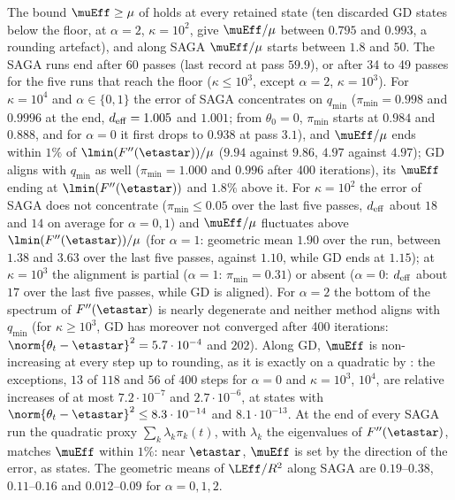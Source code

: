 The bound $\muEff\ge\mu$ of  holds at every retained state (ten discarded GD states below the floor,
at $\alpha=2$, $\kappa=10^2$, give $\muEff/\mu$ between $0.795$ and $0.993$, a rounding artefact), and along SAGA $\muEff/\mu$ starts between
$1.8$ and $50$. The SAGA runs end after 60 passes (last record at pass $59.9$), or after 34 to 49 passes for the five runs
that reach the floor ($\kappa\le10^3$, except $\alpha=2$, $\kappa=10^3$). For $\kappa=10^4$ and $\alpha\in\{0,1\}$ the
error of SAGA concentrates on $q_{\min}$ ($\pi_{\min}=0.998$ and $0.9996$ at the end, $d_{\rm eff}=1.005$ and $1.001$;
from $\theta_0=0$, $\pi_{\min}$ starts at $0.984$ and $0.888$, and for $\alpha=0$ it first drops to $0.938$ at pass
$3.1$), and $\muEff/\mu$ ends within $1\%$ of $\lmin(F''(\etastar))/\mu$ ($9.94$ against $9.86$, $4.97$ against $4.97$);
GD aligns with $q_{\min}$ as well ($\pi_{\min}=1.000$ and $0.996$ after 400 iterations), its $\muEff$ ending at
$\lmin(F''(\etastar))$ and $1.8\%$ above it. For $\kappa=10^2$ the error of SAGA does not concentrate ($\pi_{\min}\le0.05$
over the last five passes, $d_{\rm eff}$ about $18$ and $14$ on average for $\alpha=0,1$) and $\muEff/\mu$ fluctuates
above $\lmin(F''(\etastar))/\mu$ (for $\alpha=1$: geometric mean $1.90$ over the run, between $1.38$ and $3.63$ over the
last five passes, against $1.10$, while GD ends at $1.15$); at $\kappa=10^3$ the alignment is partial ($\alpha=1$:
$\pi_{\min}=0.31$) or absent ($\alpha=0$: $d_{\rm eff}$ about $17$ over the last five passes, while GD is aligned). For
$\alpha=2$ the bottom of the spectrum of $F''(\etastar)$ is nearly degenerate and neither method aligns with $q_{\min}$
(for $\kappa\ge10^3$, GD has moreover not converged after 400 iterations: $\norm{\theta_t-\etastar}^2=5.7\cdot10^{-4}$ and
$202$). Along GD, $\muEff$ is non-increasing at every step up to rounding, as it is exactly on a quadratic by
: the exceptions, $13$ of $118$ and $56$ of $400$ steps for $\alpha=0$ and $\kappa=10^3$, $10^4$, are
relative increases of at most $7.2\cdot10^{-7}$ and $2.7\cdot10^{-6}$, at states with
$\norm{\theta_t-\etastar}^2\le8.3\cdot10^{-14}$ and $8.1\cdot10^{-13}$. At the end of every SAGA run the quadratic proxy
$\sum_k\lambda_k\pi_k(t)$, with $\lambda_k$ the eigenvalues of $F''(\etastar)$, matches $\muEff$ within $1\%$: near
$\etastar$, $\muEff$ is set by the direction of the error, as  states. The geometric means of
$\LEff/R^2$ along SAGA are $0.19$--$0.38$, $0.11$--$0.16$ and $0.012$--$0.09$ for $\alpha=0,1,2$.


